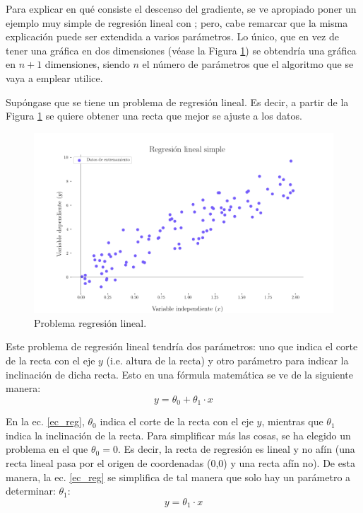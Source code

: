 Para explicar en qué consiste el descenso del gradiente, se ve apropiado poner un ejemplo muy simple de regresión lineal con ; pero, cabe remarcar que la misma explicación puede ser extendida a varios parámetros. Lo único, que en vez de tener una gráfica en dos dimensiones (véase la Figura \ref{reg_lineal}) se obtendría una gráfica en $n+1$ dimensiones, siendo $n$ el número de parámetros que el algoritmo que se vaya a emplear utilice. 

Supóngase que se tiene un problema de regresión lineal. Es decir, a partir de la Figura \ref{reg_lineal} se quiere obtener una recta que mejor se ajuste a los datos.

\begin{figure}[H]
    \centering
    \includegraphics[scale = 0.45]{imgs/reg_lineal.png}
    \caption{Problema regresión lineal.}
    \label{reg_lineal}
\end{figure}

Este problema de regresión lineal tendría dos parámetros: uno que indica el corte de la recta con el eje $y$ (i.e. altura de la recta) y otro parámetro para indicar la inclinación de dicha recta. Esto en una fórmula matemática se ve de la siguiente manera:
\begin{equation}
    \label{ec_reg}
    y = \theta_0 + \theta_1 \cdot x
\end{equation}

En la ec. \ref{ec_reg}, $\theta_0$ indica el corte de la recta con el eje $y$, mientras que $\theta_1$ indica la inclinación de la recta. Para simplificar más las cosas, se ha elegido un problema en el que $\theta_0 = 0$. Es decir, la recta de regresión es lineal y no afín (una recta lineal pasa por el origen de coordenadas (0,0) y una recta afín no). De esta manera, la ec. \ref{ec_reg} se simplifica de tal manera que solo hay un parámetro a determinar: $\theta_1$:
\begin{equation}
    \label{ec_reg2}
    y = \theta_1 \cdot x
\end{equation}

